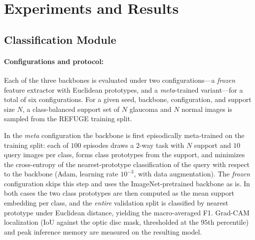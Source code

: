\documentclass[runningheads]{llncs}
\newcommand{\todo}[1]{\textcolor{red}{\textbf{[TODO: #1]}}}
\begin{document}
\section{Experiments and Results}



\subsection{Classification Module}

\paragraph{Configurations and protocol:}
Each of the three backbones is evaluated under two configurations---a \emph{frozen} feature extractor with Euclidean prototypes, and a \emph{meta}-trained variant---for a total of six configurations. For a given seed, backbone, configuration, and support size $N$, a class-balanced support set of $N$ glaucoma and $N$ normal images is sampled from the REFUGE training split. 

In the \emph{meta} configuration the backbone is first episodically meta-trained on the training split: each of $100$ episodes draws a $2$-way task with $N$ support and $10$ query images per class, forms class prototypes from the support, and minimizes the cross-entropy of the nearest-prototype classification of the query with respect to the backbone (Adam, learning rate $10^{-3}$, with data augmentation). The \emph{frozen} configuration skips this step and uses the ImageNet-pretrained backbone as is. In both cases the two class prototypes are then computed as the mean support embedding per class, and the \emph{entire} validation split is classified by nearest prototype under Euclidean distance, yielding the macro-averaged F1. Grad-CAM localization (IoU against the optic disc mask, thresholded at the $95$th percentile) and peak inference memory are measured on the resulting model.
\end{document}

